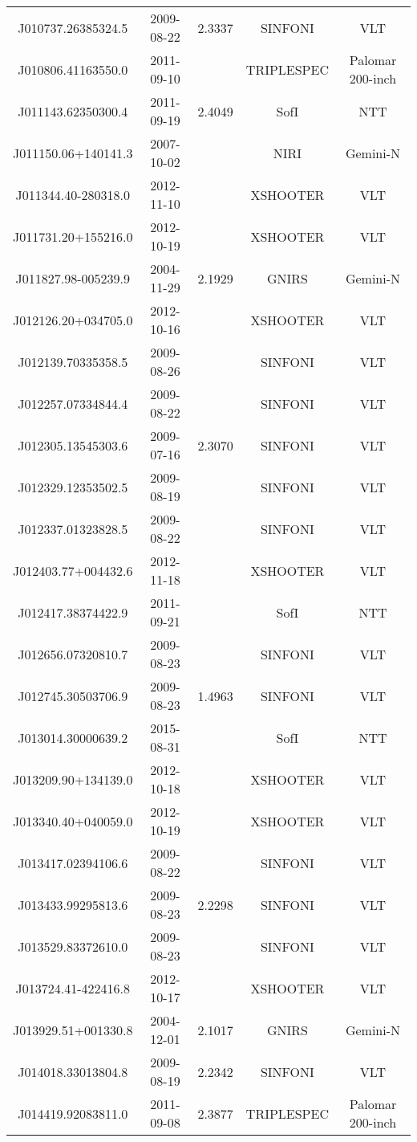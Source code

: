 {\begin{longtable}{ccccc}
J010737.26385324.5 & 2009-08-22 & 2.3337 & SINFONI & VLT \\
J010806.41163550.0 & 2011-09-10 &  & TRIPLESPEC & Palomar 200-inch \\
J011143.62350300.4 & 2011-09-19 & 2.4049 & SofI & NTT \\
J011150.06+140141.3 & 2007-10-02 &  & NIRI & Gemini-N \\
J011344.40-280318.0 & 2012-11-10 &  & XSHOOTER & VLT \\
J011731.20+155216.0 & 2012-10-19 &  & XSHOOTER & VLT \\
J011827.98-005239.9 & 2004-11-29 & 2.1929 & GNIRS & Gemini-N \\
J012126.20+034705.0 & 2012-10-16 &  & XSHOOTER & VLT \\
J012139.70335358.5 & 2009-08-26 &  & SINFONI & VLT \\
J012257.07334844.4 & 2009-08-22 &  & SINFONI & VLT \\
J012305.13545303.6 & 2009-07-16 & 2.3070 & SINFONI & VLT \\
J012329.12353502.5 & 2009-08-19 &  & SINFONI & VLT \\
J012337.01323828.5 & 2009-08-22 &  & SINFONI & VLT \\
J012403.77+004432.6 & 2012-11-18 &  & XSHOOTER & VLT \\
J012417.38374422.9 & 2011-09-21 &  & SofI & NTT \\
J012656.07320810.7 & 2009-08-23 &  & SINFONI & VLT \\
J012745.30503706.9 & 2009-08-23 & 1.4963 & SINFONI & VLT \\
J013014.30000639.2 & 2015-08-31 &  & SofI & NTT \\
J013209.90+134139.0 & 2012-10-18 &  & XSHOOTER & VLT \\
J013340.40+040059.0 & 2012-10-19 &  & XSHOOTER & VLT \\
J013417.02394106.6 & 2009-08-22 &  & SINFONI & VLT \\
J013433.99295813.6 & 2009-08-23 & 2.2298 & SINFONI & VLT \\
J013529.83372610.0 & 2009-08-23 &  & SINFONI & VLT \\
J013724.41-422416.8 & 2012-10-17 &  & XSHOOTER & VLT \\
J013929.51+001330.8 & 2004-12-01 & 2.1017 & GNIRS & Gemini-N \\
J014018.33013804.8 & 2009-08-19 & 2.2342 & SINFONI & VLT \\
J014419.92083811.0 & 2011-09-08 & 2.3877 & TRIPLESPEC & Palomar 200-inch \\

\end{longtable}}
